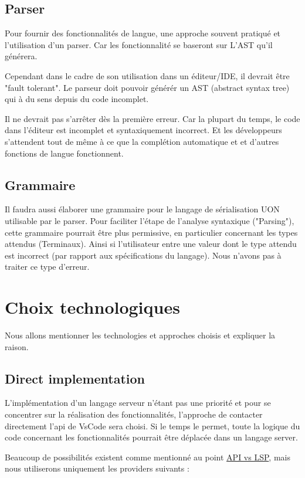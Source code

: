 \documentclass[
    iict, %
    il, %
]{heig-tb}
\begin{document}
\subsection{Parser}
Pour fournir des fonctionnalités de langue, une approche souvent pratiqué et l'utilisation d'un parser.
Car les fonctionnalité se baseront sur L'AST qu'il générera.

Cependant dans le cadre de son utilisation dans un éditeur/IDE, il devrait être "fault tolerant". Le parseur doit pouvoir générér un AST (abstract syntax tree) qui à du sens depuis du code incomplet.

Il ne devrait pas s'arrêter dès la première erreur. Car la plupart du temps, le code dans l'éditeur est incomplet et syntaxiquement incorrect.
Et les développeurs s'attendent tout de même à ce que la complétion automatique et et d'autres fonctions de langue fonctionnent.

\subsection{Grammaire}
Il faudra aussi élaborer une grammaire pour le langage de sérialisation UON utilisable par le parser.
Pour faciliter l'étape de l'analyse syntaxique ("Parsing"), cette grammaire pourrait être plus permissive, en particulier concernant les types attendus (Terminaux).
Ainsi si l'utilisateur entre une valeur dont le type attendu est incorrect (par rapport aux spécifications du langage). Nous n'avons pas à traiter ce type d'erreur.

\section{Choix technologiques}
Nous allons mentionner les technologies et approches choisis et expliquer la raison.

\subsection{Direct implementation}
L'implémentation d'un langage serveur n'étant pas une priorité et pour se concentrer sur la réalisation des fonctionnalités, l'approche de contacter directement l'api de VsCode sera choisi.
Si le temps le permet, toute la logique du code concernant les fonctionnalités pourrait être déplacée dans un langage server.

Beaucoup de possibilités existent comme mentionné au point \hyperref[api vs lsp]{API vs LSP}, mais nous utiliserons uniquement les providers suivants :
\end{document}
